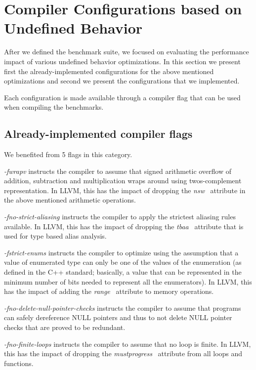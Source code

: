 \section{Compiler Configurations based on Undefined Behavior} \label{sec:flags}

After we defined the benchmark suite, we focused on evaluating the performance
impact of various undefined behavior optimizations. In this section we present
first the already-implemented configurations for the above mentioned
optimizations and second we present the configurations that we implemented.

Each configuration is made available through a compiler flag that can be used
when compiling the benchmarks.

\subsection{Already-implemented compiler flags}

We benefited from 5 flags in this category.

\textit{-fwrapv} instructs the compiler to assume that signed arithmetic
overflow of addition, subtraction and multiplication wraps around using
twos-complement representation. In LLVM, this has the impact of dropping the
\textit{nsw}~\cite{nsw-def} attribute in the above mentioned arithmetic
operations.

\textit{-fno-strict-aliasing} instructs the compiler to apply the strictest
aliasing rules available. In LLVM, this has the impact of dropping the
\textit{tbaa}~\cite{tbaa-def} attribute that is used for type based alias
analysis.

\textit{-fstrict-enums} instructs the compiler to optimize using the assumption
that a value of enumerated type can only be one of the values of the enumeration
(as defined in the C++ standard; basically, a value that can be represented in
the minimum number of bits needed to represent all the enumerators). In LLVM,
this has the impact of adding the \textit{range}~\cite{range-def} attribute to
memory operations.

\textit{-fno-delete-null-pointer-checks} instructs the compiler to assume that
programs can safely dereference NULL pointers and thus to not delete NULL
pointer checks that are proved to be redundant.

\textit{-fno-finite-loops} instructs the compiler to assume that no loop is
finite. In LLVM, this has the impact of dropping the
\textit{mustprogress}~\cite{mustprogress-def} attribute from all loops and
functions.


